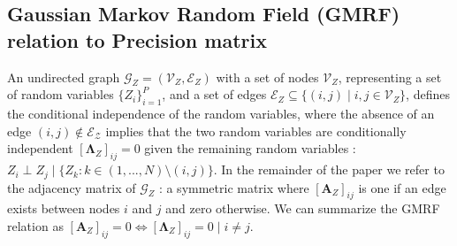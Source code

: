\documentclass{article}
\theoremstyle{plain}
\theoremstyle{definition}
\theoremstyle{remark}
\def\*#1{\boldsymbol{#1}}
\begin{document}
\subsection{Gaussian Markov Random Field (GMRF) relation to Precision matrix} An undirected graph $\mathcal{G}_Z = (\mathcal{V}_Z, \mathcal{E}_Z)$ with a set of nodes $\mathcal{V}_Z$, representing a set of random variables $\{Z_i\}_{i=1}^P$, and a set of edges $\mathcal{E}_Z \subseteq \{(i,j) \mid i,j \in \mathcal{V}_Z\}$, defines the conditional independence of the random variables, where the absence of an edge $(i,j) \notin \mathcal{E_Z}$ implies that the two random variables are conditionally independent $[\*\Lambda_Z]_{ij} = 0$ given the remaining random variables \cite{bishop2006PRML,hastie2009elements,lauritzen1996graphical,rue2005gaussian}: $Z_i \perp Z_j \mid \{Z_k : k \in (1,...,N) \setminus (i,j)\}$. In the remainder of the paper we refer to the adjacency matrix of $\mathcal{G}_Z$ : a symmetric matrix where $[\*A_Z]_{ij}$ is one if an edge exists between nodes $i$ and $j$ and zero otherwise. We can summarize the GMRF relation as $[\*A_Z]_{ij} = 0 \iff [\*\Lambda_Z]_{ij} = 0 \mid i \neq j$.
\end{document}
